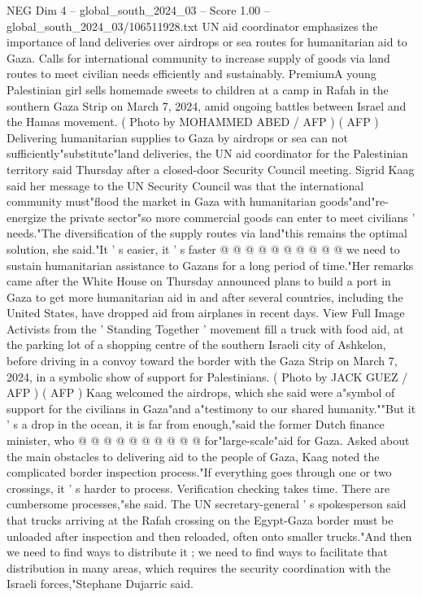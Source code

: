 \begin{textsample}{NEG Dim 4 – global\_south\_2024\_03 – Score 1.00 – global\_south\_2024\_03/106511928.txt}  \label{ex:f4_neg_359}
UN aid coordinator emphasizes the importance of land deliveries over airdrops or sea routes for humanitarian aid to Gaza.
Calls for international community to increase supply of goods via land routes to meet civilian needs efficiently and sustainably.
PremiumA young Palestinian girl sells homemade sweets to children at a camp in Rafah in the southern Gaza Strip on March 7, 2024, amid ongoing battles between Israel and the Hamas movement. ( Photo by MOHAMMED ABED / AFP ) ( AFP ) Delivering humanitarian supplies to Gaza by airdrops or sea can not sufficiently"substitute"land deliveries, the UN aid coordinator for the Palestinian territory said Thursday after a closed-door Security Council meeting.
Sigrid Kaag said her message to the UN Security Council was that the international community must"flood the market in Gaza with humanitarian goods"and"re-energize the private sector"so more commercial goods can enter to meet civilians ' needs."The diversification of the supply routes via land"this remains the optimal solution, she said."It ' s easier, it ' s faster @ @ @ @ @ @ @ @ @ @ we need to sustain humanitarian assistance to Gazans for a long period of time."Her remarks came after the White House on Thursday announced plans to build a port in Gaza to get more humanitarian aid in and after several countries, including the United States, have dropped aid from airplanes in recent days.
View Full Image Activists from the ' Standing Together ' movement fill a truck with food aid, at the parking lot of a shopping centre of the southern Israeli city of Ashkelon, before driving in a convoy toward the border with the Gaza Strip on March 7, 2024, in a symbolic show of support for Palestinians. ( Photo by JACK GUEZ / AFP ) ( AFP ) Kaag welcomed the airdrops, which she said were a"symbol of support for the civilians in Gaza"and a"testimony to our shared humanity.""But it ' s a drop in the ocean, it is far from enough,"said the former Dutch finance minister, who @ @ @ @ @ @ @ @ @ @ for"large-scale"aid for Gaza.
Asked about the main obstacles to delivering aid to the people of Gaza, Kaag noted the complicated border inspection process."If everything goes through one or two crossings, it ' s harder to process.
Verification checking takes time.
There are cumbersome processes,"she said.
The UN secretary-general ' s spokesperson said that trucks arriving at the Rafah crossing on the Egypt-Gaza border must be unloaded after inspection and then reloaded, often onto smaller trucks."And then we need to find ways to distribute it ; we need to find ways to facilitate that distribution in many areas, which requires the security coordination with the Israeli forces,"Stephane Dujarric said.

\end{textsample}
